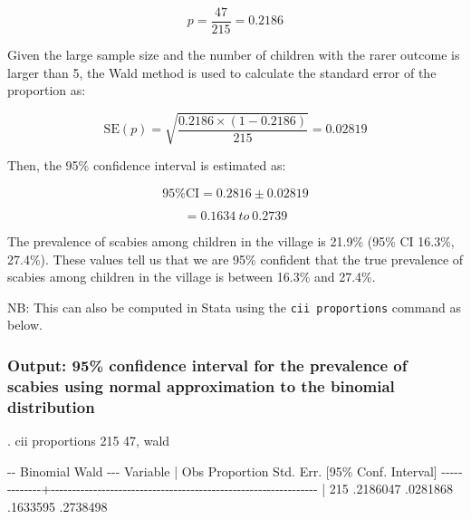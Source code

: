 \documentclass[
]{memoir}
\newenvironment{Shaded}{\begin{snugshade}}{\end{snugshade}}
\newcommand{\NormalTok}[1]{#1}
\begin{document}
\[ p = \frac{47}{215} = 0.2186 \]

Given the large sample size and the number of children with the rarer outcome is larger than 5, the Wald method is used to calculate the standard error of the proportion as:

\[{\text{SE}\left( p \right) = \sqrt{\frac{0.2186 \times (1 - 0.2186)}{215}}
}{= 0.02819}\]

Then, the 95\% confidence interval is estimated as:

\[\text{95\% CI} = 0.2816 \pm 0.02819\]

\[= 0.1634\ to\ 0.2739\]

The prevalence of scabies among children in the village is 21.9\% (95\% CI 16.3\%, 27.4\%). These values tell us that we are 95\% confident that the true prevalence of scabies among children in the village is between 16.3\% and 27.4\%.

NB: This can also be computed in Stata using the \texttt{cii\ proportions} command as below.

\hypertarget{output-95-confidence-interval-for-the-prevalence-of-scabies-using-normal-approximation-to-the-binomial-distribution}{%
\subsubsection*{Output: 95\% confidence interval for the prevalence of scabies using normal approximation to the binomial distribution}\label{output-95-confidence-interval-for-the-prevalence-of-scabies-using-normal-approximation-to-the-binomial-distribution}}

\begin{Shaded}
\begin{Highlighting}[]
\NormalTok{. cii proportions 215 47, wald}

\NormalTok{                                                         {-}{-} Binomial Wald {-}{-}{-}}
\NormalTok{    Variable |        Obs  Proportion    Std. Err.       [95\% Conf. Interval]}
\NormalTok{{-}{-}{-}{-}{-}{-}{-}{-}{-}{-}{-}{-}{-}+{-}{-}{-}{-}{-}{-}{-}{-}{-}{-}{-}{-}{-}{-}{-}{-}{-}{-}{-}{-}{-}{-}{-}{-}{-}{-}{-}{-}{-}{-}{-}{-}{-}{-}{-}{-}{-}{-}{-}{-}{-}{-}{-}{-}{-}{-}{-}{-}{-}{-}{-}{-}{-}{-}{-}{-}{-}{-}{-}{-}{-}{-}{-}}
\NormalTok{             |        215    .2186047    .0281868        .1633595    .2738498}
\end{Highlighting}
\end{Shaded}
\end{document}
